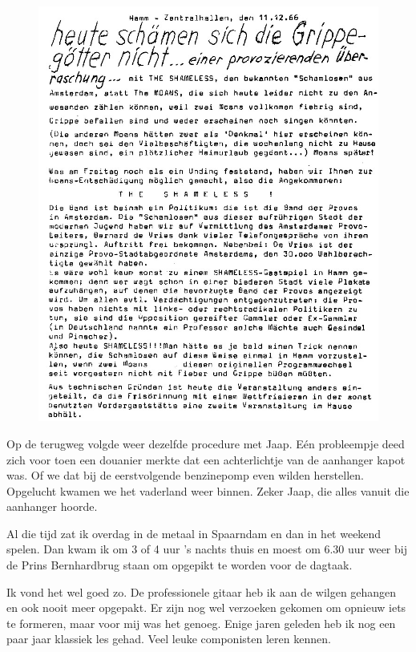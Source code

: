 \documentclass[12pt,twoside, openright]{memoir}
\begin{document}
\begin{figure}
\centering
\includegraphics[width=\textwidth]{img/ch30/schamensich}
\end{figure}

Op de terugweg volgde weer dezelfde procedure met Jaap. Eén probleempje deed zich voor toen een douanier merkte dat een achterlichtje van de aanhanger kapot was. Of we dat bij de eerstvolgende benzinepomp even wilden herstellen. Opgelucht kwamen we het vaderland weer binnen. Zeker Jaap, die alles vanuit die aanhanger hoorde.

Al die tijd zat ik overdag in de metaal in Spaarndam en dan in het weekend spelen. Dan kwam ik om 3 of 4 uur ’s nachts thuis en moest om 6.30 uur weer bij de Prins Bernhardbrug staan om opgepikt te worden voor de dagtaak. 

Ik vond het wel goed zo. De professionele gitaar heb ik aan de wilgen gehangen en ook nooit meer opgepakt. Er zijn nog wel verzoeken gekomen om opnieuw iets te formeren, maar voor mij was het genoeg. Enige jaren geleden heb ik nog een paar jaar klassiek les gehad. Veel leuke componisten leren kennen.
\end{document}
